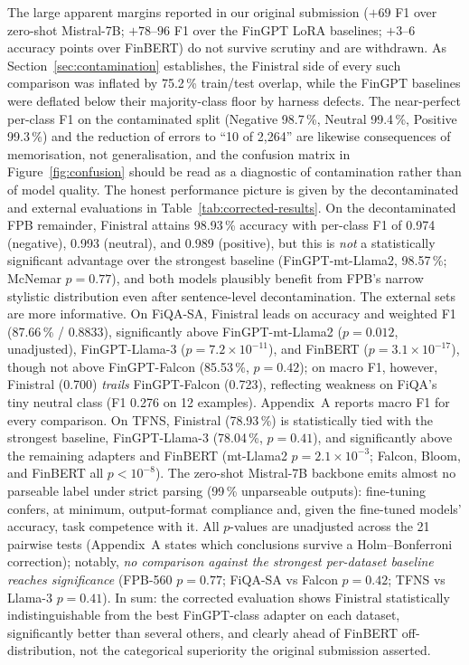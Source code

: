 \documentclass[a4paper]{article}
\begin{document}
The large apparent margins reported in our original submission ($+69$ F1 over zero-shot Mistral-7B; $+78$--$96$ F1 over the FinGPT LoRA baselines; $+3$--$6$ accuracy points over FinBERT) do not survive scrutiny and are withdrawn. As Section~\ref{sec:contamination} establishes, the Finistral side of every such comparison was inflated by 75.2\,\% train/test overlap, while the FinGPT baselines were deflated below their majority-class floor by harness defects. The near-perfect per-class F1 on the contaminated split (Negative 98.7\,\%, Neutral 99.4\,\%, Positive 99.3\,\%) and the reduction of errors to ``10 of 2{,}264'' are likewise consequences of memorisation, not generalisation, and the confusion matrix in Figure~\ref{fig:confusion} should be read as a diagnostic of contamination rather than of model quality. The honest performance picture is given by the decontaminated and external evaluations in Table~\ref{tab:corrected-results}. On the decontaminated FPB remainder, Finistral attains 98.93\,\% accuracy with per-class F1 of 0.974 (negative), 0.993 (neutral), and 0.989 (positive), but this is \emph{not} a statistically significant advantage over the strongest baseline (FinGPT-mt-Llama2, 98.57\,\%; McNemar $p = 0.77$), and both models plausibly benefit from FPB's narrow stylistic distribution even after sentence-level decontamination. The external sets are more informative. On FiQA-SA, Finistral leads on accuracy and weighted F1 (87.66\,\% / 0.8833), significantly above FinGPT-mt-Llama2 ($p = 0.012$, unadjusted), FinGPT-Llama-3 ($p = 7.2\times10^{-11}$), and FinBERT ($p = 3.1\times10^{-17}$), though not above FinGPT-Falcon (85.53\,\%, $p = 0.42$); on macro F1, however, Finistral (0.700) \emph{trails} FinGPT-Falcon (0.723), reflecting weakness on FiQA's tiny neutral class (F1 0.276 on 12 examples). Appendix~A reports macro F1 for every comparison. On TFNS, Finistral (78.93\,\%) is statistically tied with the strongest baseline, FinGPT-Llama-3 (78.04\,\%, $p = 0.41$), and significantly above the remaining adapters and FinBERT (mt-Llama2 $p = 2.1\times10^{-3}$; Falcon, Bloom, and FinBERT all $p < 10^{-8}$). The zero-shot Mistral-7B backbone emits almost no parseable label under strict parsing (99\,\% unparseable outputs): fine-tuning confers, at minimum, output-format compliance and, given the fine-tuned models' accuracy, task competence with it. All $p$-values are unadjusted across the 21 pairwise tests (Appendix~A states which conclusions survive a Holm--Bonferroni correction); notably, \emph{no comparison against the strongest per-dataset baseline reaches significance} (FPB-560 $p=0.77$; FiQA-SA vs Falcon $p=0.42$; TFNS vs Llama-3 $p=0.41$). In sum: the corrected evaluation shows Finistral statistically indistinguishable from the best FinGPT-class adapter on each dataset, significantly better than several others, and clearly ahead of FinBERT off-distribution, not the categorical superiority the original submission asserted.
\end{document}
